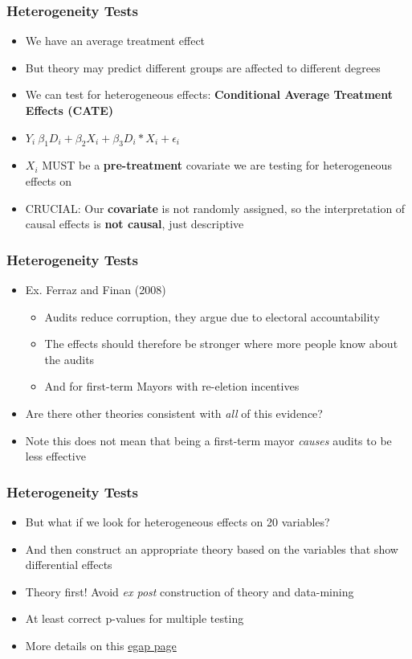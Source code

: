 \documentclass[xcolor=x11names,compress]{beamer}\usepackage[]{graphicx}\usepackage[]{color}
\renewcommand{\(}{\begin{columns}}
\renewcommand{\)}{\end{columns}}
\newcommand{\<}[1]{\begin{column}{#1}}
\renewcommand{\>}{\end{column}}
\begin{document}
\begin{frame}
\frametitle{Heterogeneity Tests}
\begin{itemize}
\item We have an average treatment effect
\pause
\item But theory may predict different groups are affected to different degrees
\pause
\item We can test for heterogeneous effects: \textbf{Conditional Average Treatment Effects (CATE)}
\pause
\item $Y_i ~ \beta_1 D_i + \beta_2 X_i + \beta_3 D_i*X_i + \epsilon_i$
\pause
\item $X_i$ MUST be a \textbf{pre-treatment} covariate we are testing for heterogeneous effects on
\pause
\item CRUCIAL: Our \textbf{covariate} is not randomly assigned, so the interpretation of causal effects is \textbf{not causal}, just descriptive
\end{itemize}
\end{frame}

\begin{frame}
\frametitle{Heterogeneity Tests}
\begin{itemize}
\item Ex. Ferraz and Finan (2008)
\begin{itemize}
\item Audits reduce corruption, they argue due to electoral accountability
\pause
\item The effects should therefore be stronger where more people know about the audits
\pause
\item And for first-term Mayors with re-eletion incentives
\end{itemize}
\item Are there other theories consistent with \textit{all} of this evidence?
\pause
\item Note this does not mean that being a first-term mayor \textit{causes} audits to be less effective
\end{itemize}
\end{frame}

\begin{frame}
\frametitle{Heterogeneity Tests}
\begin{itemize}
\item But what if we look for heterogeneous effects on 20 variables?
\pause
\item And then construct an appropriate theory based on the variables that show differential effects
\pause
\item Theory first! Avoid \textit{ex post} construction of theory and data-mining
\pause
\item At least correct p-values for multiple testing 
\pause
\item More details on this \href{https://egap.org/methods-guides/10-things-heterogeneous-treatment-effects}{egap page}
\end{itemize}
\end{frame}
\end{document}
